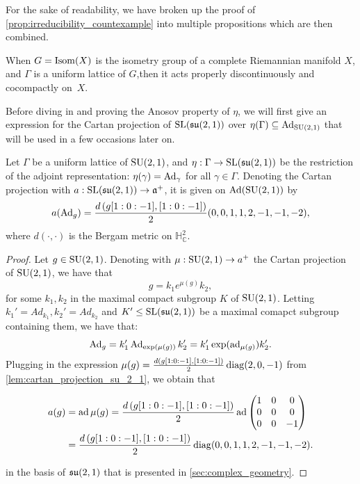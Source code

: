 \documentclass{report}
\begin{document}
For the sake of readability, we have broken up the proof of \cref{prop:irreducibility_countexample} into multiple propositions which are then combined.



\begin{remark}
    When $G = \operatorname{Isom}(X)$ is the isometry group of a complete Riemannian manifold $X$, and $\Gamma$ is a uniform lattice of $G$,then it acts properly discontinuously and cocompactly on~$X$.
\end{remark}

Before diving in and proving the Anosov property of $\eta$, we will first give an expression for the Cartan projection of $\operatorname{{\mathrm{SL}}}(\operatorname{{\mathfrak{su}}}(2,1))$ over $\eta(\Gamma) \subseteq \operatorname{Ad}_{\operatorname{{\mathrm{SU}}}(2,1)}$ that will be used in a few occasions later on.
\begin{lemma}\label{lem:cartan_projection_ad}
    Let $\Gamma$ be a uniform lattice of $\operatorname{{\mathrm{SU}}}(2,1)$, and $\eta: \Gamma \to \operatorname{{\mathrm{SL}}}(\mathfrak{su}(2,1))$ be the restriction of the adjoint representation: $\eta(\gamma) = \operatorname{Ad}_{\gamma}$ for all $\gamma \in \Gamma$. 
    Denoting the Cartan projection with $a: \operatorname{{\mathrm{SL}}}(\operatorname{{\mathfrak{su}}}(2,1)) \to \mathfrak a^+$, it is given on $\operatorname{Ad}(\operatorname{{\mathrm{SU}}}(2,1))$ by
    \[
    a(\operatorname{Ad}_g) = \frac{d\left(g [1:0:-1], [1:0:-1]\right)}{2} (0, 0, 1, 1, 2, -1, -1, -2),
    \]
    where $d(\cdot, \cdot)$ is the Bergam metric on $\mathbb H^2_{\mathbb C}$.
\end{lemma}
\begin{proof}
Let $g \in \operatorname{{\mathrm{SU}}}(2,1)$.
Denoting with $\mu: \operatorname{{\mathrm{SU}}}(2,1) \to a^+$ the Cartan projection of $\operatorname{{\mathrm{SU}}}(2,1)$, we have that
\[
g = k_1 e^{\mu(g)} k_2,
\]
for some $k_1, k_2$ in the maximal compact subgroup $K$ of $\operatorname{{\mathrm{SU}}}(2,1)$.
Letting $k_1' = Ad_{k_1}, k_2' = Ad_{k_2}$ and $K' \leq \operatorname{{\mathrm{SL}}}(\operatorname{{\mathfrak{su}}}(2,1))$ be a maximal comapct subgroup containing them, we have that:
\[
\operatorname{Ad}_{g} = k_1' \operatorname{Ad}_{\exp(\mu(g))} k_2' = k_1' \exp(\operatorname{ad}_{\mu(g)}) k_2'.
\]
Plugging in the expression $\mu(g) = \frac{d\left(g [1:0:-1], [1:0:-1]\right)}{2} \operatorname{diag}(2, 0, -1)$ from \cref{lem:cartan_projection_su_2_1}, we obtain that

\begin{align*}
    a(g) &= \operatorname{ad} \mu(g) = \frac{d\left(g [1:0:-1], [1:0:-1]\right)}{2} \operatorname{ad} \begin{pmatrix}
        1 & 0 & 0\\
        0 & 0 & 0\\
        0 & 0 & -1
    \end{pmatrix}\\
    &= \frac{d\left(g [1:0:-1], [1:0:-1]\right)}{2} \operatorname{diag}(0, 0, 1, 1, 2, -1, -1, -2).
\end{align*}

in the basis of $\operatorname{{\mathfrak{su}}}(2,1)$ that is presented in \cref{sec:complex_geometry}.
\end{proof}
\end{document}

